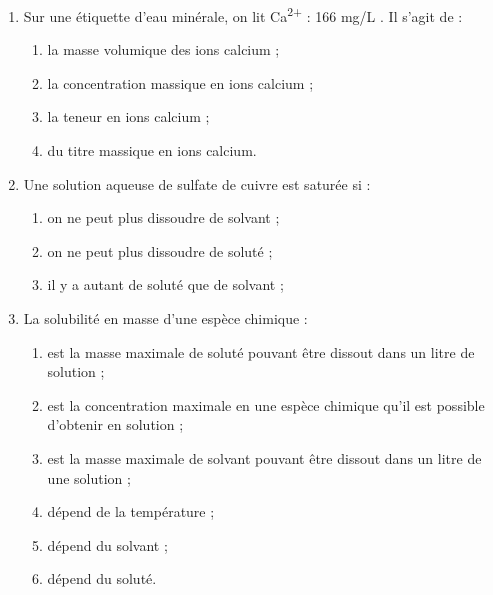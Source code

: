 \begin{enumerate}
\begin{multicols}{2}
\begin{spacing}{1.5}
Compléter la phrase suivante :

\og La solution numéro \underline{\quad} est plus concentrée que la solution \underline{\quad}, elle même plus concentrée que la solution \underline{\quad}.\fg{}
\end{spacing}
\end{multicols}

\item Sur une étiquette d'eau minérale, on lit \og Ca\textsuperscript{2+} : 166 mg/L \fg{}.
Il s'agit de :
\begin{multicols}{2}
\begin{enumerate}
\item la masse volumique des ions calcium ;
\item la concentration massique en ions calcium ;
\item la teneur en ions calcium ;
\item du titre massique en ions calcium.
\end{enumerate}
\end{multicols}

\item Une solution aqueuse de sulfate de cuivre est saturée si :
\begin{multicols}{2}
\begin{enumerate}
\item on ne peut plus dissoudre de solvant ;
\item on ne peut plus dissoudre de soluté ;
\item il y a autant de soluté que de solvant ; 
\end{enumerate}
\end{multicols}

\item La solubilité en masse d'une espèce chimique :
\begin{multicols}{2}
\begin{enumerate}
\item est la masse maximale de soluté pouvant être dissout dans un litre de solution ;
\item est la concentration maximale en une espèce chimique qu'il est possible d'obtenir en solution ;
\item est la masse maximale de solvant pouvant être dissout dans un litre de une solution ;
\item dépend de la température ;
\item dépend du solvant ;
\item dépend du soluté.
\end{enumerate}
\end{multicols}


\end{enumerate}
